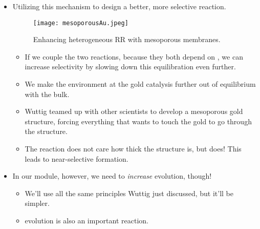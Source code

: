 \documentclass[../notes.tex]{subfiles}
\begin{document}
\begin{itemize}
    \item Utilizing this mechanism to design a better, more selective reaction.
    \begin{figure}[H]
        \centering
        \texttt{[image: mesoporousAu.jpeg]}
        \caption{Enhancing heterogeneous RR with mesoporous membranes.}
        \label{fig:mesoporousAu}
    \end{figure}
    \begin{itemize}
        \item If we couple the two reactions, because they both depend on , we can increase selectivity by slowing down this equilibration even further.
        \item We make the environment at the gold catalysis further out of equilibrium with the bulk.
        \item Wuttig teamed up with other scientists to develop a mesoporous gold structure, forcing everything that wants to touch the gold to go through the structure.
        \item The  reaction does not care how thick the structure is, but  does! This leads to near-selective  formation.
    \end{itemize}
    \item In our module, however, we need to \emph{increase}  evolution, though!
    \begin{itemize}
        \item We'll use all the same principles Wuttig just discussed, but it'll be simpler.
        \item {} evolution is also an important reaction.
    \end{itemize}
\end{itemize}
\end{document}
